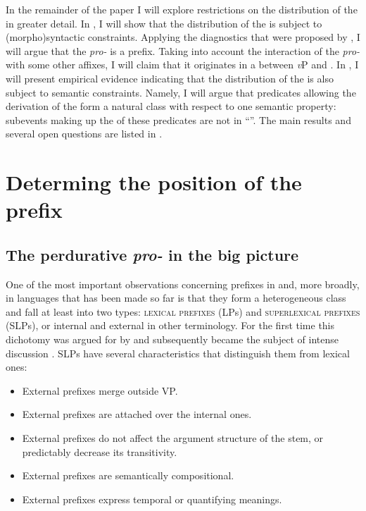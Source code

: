 \documentclass[output=paper,colorlinks,citecolor=brown,newtxmath]{langsci/langscibook}
\begin{document}
In the remainder of the paper I will explore restrictions on the distribution of the  in greater detail. In , I will show that the distribution of the  is subject to (morpho)syntactic constraints. Applying the diagnostics that were proposed by \citet{tatevosov2009mnozestvennaja,tatevosov2013mnozestvennaja}, I will argue that the  \textit{pro-} is a  prefix. Taking into account the interaction of the  \textit{pro-} with some other affixes, I will claim that it originates in a  between \textit{v}P and . In , I will present empirical evidence indicating that the distribution of the  is also subject to semantic constraints. Namely, I will argue that predicates allowing the derivation of the  form a natural class with respect to one semantic property: subevents making up the  of these predicates are not in  ``''. The main results and several open questions are listed in .


\section{Determing the position of the prefix} \label{sec:naumov:2}
\subsection{The perdurative \textit{pro-} in the big picture} \label{sec:naumov:2.1}
One of the most important observations concerning prefixes in  and, more broadly, in  languages that has been made so far is that they form a heterogeneous class and fall at least into two types: \textsc{lexical prefixes} (LPs) and \textsc{superlexical prefixes} (SLPs), or internal and external in other terminology. For the first time this dichotomy was argued for by \citet{babko1999zero} and subsequently became the subject of intense discussion \citep[see, e.\,g.,][]{svenonius2004slavic, ramchand2005time, romanova2005superlexical, romanova2007constructing, tolskaya2015verbal}. SLPs have several characteristics that distinguish them from lexical ones:
\begin{itemize}
    \item External prefixes merge outside VP.
\item External prefixes are attached over the internal ones.
\item External prefixes do not affect the argument 	structure of the  stem, or predictably decrease its transitivity.
\item External prefixes are semantically compositional.
\item External prefixes express temporal or quantifying meanings.
\end{itemize}
\end{document}
